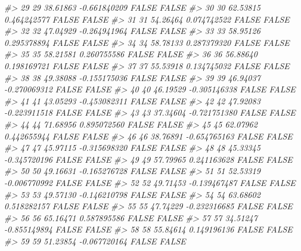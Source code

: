 \documentclass[
  oneside]{book}
\newenvironment{Shaded}{\begin{snugshade}}{\end{snugshade}}
\newcommand{\CommentTok}[1]{\textcolor[rgb]{0.56,0.35,0.01}{\textit{#1}}}
\begin{document}
\begin{Shaded}
\begin{Highlighting}[]
\CommentTok{\#\textgreater{} 29   29  38.61863 {-}0.661840209     FALSE       FALSE}
\CommentTok{\#\textgreater{} 30   30  62.53815  0.464242577     FALSE       FALSE}
\CommentTok{\#\textgreater{} 31   31  54.26464  0.074742522     FALSE       FALSE}
\CommentTok{\#\textgreater{} 32   32  47.04929 {-}0.264941964     FALSE       FALSE}
\CommentTok{\#\textgreater{} 33   33  58.95126  0.295378894     FALSE       FALSE}
\CommentTok{\#\textgreater{} 34   34  58.78133  0.287379320     FALSE       FALSE}
\CommentTok{\#\textgreater{} 35   35  58.21581  0.260755586     FALSE       FALSE}
\CommentTok{\#\textgreater{} 36   36  56.88640  0.198169721     FALSE       FALSE}
\CommentTok{\#\textgreater{} 37   37  55.53918  0.134745032     FALSE       FALSE}
\CommentTok{\#\textgreater{} 38   38  49.38088 {-}0.155175036     FALSE       FALSE}
\CommentTok{\#\textgreater{} 39   39  46.94037 {-}0.270069312     FALSE       FALSE}
\CommentTok{\#\textgreater{} 40   40  46.19529 {-}0.305146338     FALSE       FALSE}
\CommentTok{\#\textgreater{} 41   41  43.05293 {-}0.453082311     FALSE       FALSE}
\CommentTok{\#\textgreater{} 42   42  47.92083 {-}0.223911518     FALSE       FALSE}
\CommentTok{\#\textgreater{} 43   43  37.34604 {-}0.721751380     FALSE       FALSE}
\CommentTok{\#\textgreater{} 44   44  71.68956  0.895072560     FALSE       FALSE}
\CommentTok{\#\textgreater{} 45   45  62.07962  0.442655944     FALSE       FALSE}
\CommentTok{\#\textgreater{} 46   46  38.76891 {-}0.654765163     FALSE       FALSE}
\CommentTok{\#\textgreater{} 47   47  45.97115 {-}0.315698320     FALSE       FALSE}
\CommentTok{\#\textgreater{} 48   48  45.33345 {-}0.345720196     FALSE       FALSE}
\CommentTok{\#\textgreater{} 49   49  57.79965  0.241163628     FALSE       FALSE}
\CommentTok{\#\textgreater{} 50   50  49.16631 {-}0.165276728     FALSE       FALSE}
\CommentTok{\#\textgreater{} 51   51  52.53319 {-}0.006770992     FALSE       FALSE}
\CommentTok{\#\textgreater{} 52   52  49.71453 {-}0.139467487     FALSE       FALSE}
\CommentTok{\#\textgreater{} 53   53  49.57130 {-}0.146210798     FALSE       FALSE}
\CommentTok{\#\textgreater{} 54   54  63.68602  0.518282157     FALSE       FALSE}
\CommentTok{\#\textgreater{} 55   55  47.74229 {-}0.232316685     FALSE       FALSE}
\CommentTok{\#\textgreater{} 56   56  65.16471  0.587895586     FALSE       FALSE}
\CommentTok{\#\textgreater{} 57   57  34.51247 {-}0.855149894     FALSE       FALSE}
\CommentTok{\#\textgreater{} 58   58  55.84614  0.149196136     FALSE       FALSE}
\CommentTok{\#\textgreater{} 59   59  51.23854 {-}0.067720164     FALSE       FALSE}

\end{Highlighting}
\end{Shaded}
\end{document}
